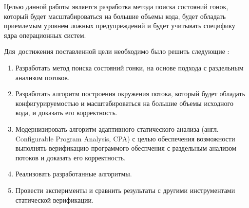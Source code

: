
%
%


{\aimandtasks} Целью данной работы является разработка метода поиска состояний гонок, который будет масштабироваться на большие объемы кода, будет обладать приемлемым уровнем ложных предупреждений и будет учитывать специфику ядра операционных систем.

Для~достижения поставленной цели необходимо было решить следующие {\tasks}:
\begin{enumerate}
  \item Разработать метод поиска состояний гонки, на основе подхода с раздельным анализом потоков.
  \item Разработать алгоритм построения окружения потока, который будет обладать конфигурируемостью и масштабироваться на большие объемы исходного кода, и доказать его корректность.
  \item Модернизировать алгоритм адаптивного статического анализа (англ. Configurable Program Analysis, CPA) с целью обеспечения возможности выполнять верификацию программого обеспчения с раздельным анализом потоков и доказать его корректность.
  \item Реализовать разработанные алгоритмы.
  \item Провести эксперименты и сравнить результаты с другими инструментами статической верификации.
\end{enumerate}

